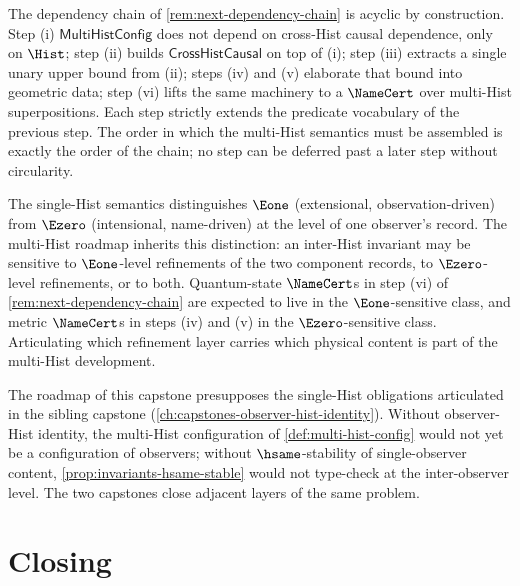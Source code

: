 \begin{remark}
\label{rem:chain-acyclic}
The dependency chain of \autoref{rem:next-dependency-chain} is acyclic by construction. Step (i) \(\mathsf{MultiHistConfig}\) does not depend on cross-Hist causal dependence, only on \(\Hist\); step (ii) builds \(\mathsf{CrossHistCausal}\) on top of (i); step (iii) extracts a single unary upper bound from (ii); steps (iv) and (v) elaborate that bound into geometric data; step (vi) lifts the same machinery to a \(\NameCert\) over multi-Hist superpositions. Each step strictly extends the predicate vocabulary of the previous step. The order in which the multi-Hist semantics must be assembled is exactly the order of the chain; no step can be deferred past a later step without circularity.
\end{remark}

\begin{remark}
\label{rem:e1-e0-multi-hist}
The single-Hist semantics distinguishes \(\Eone\) (extensional, observation-driven) from \(\Ezero\) (intensional, name-driven) at the level of one observer's record. The multi-Hist roadmap inherits this distinction: an inter-Hist invariant may be sensitive to \(\Eone\)-level refinements of the two component records, to \(\Ezero\)-level refinements, or to both. Quantum-state \(\NameCert\)s in step (vi) of \autoref{rem:next-dependency-chain} are expected to live in the \(\Eone\)-sensitive class, and metric \(\NameCert\)s in steps (iv) and (v) in the \(\Ezero\)-sensitive class. Articulating which refinement layer carries which physical content is part of the multi-Hist development.
\end{remark}

\begin{remark}
\label{rem:single-hist-preconditions}
The roadmap of this capstone presupposes the single-Hist obligations articulated in the sibling capstone (\autoref{ch:capstones-observer-hist-identity}). Without observer-Hist identity, the multi-Hist configuration of \autoref{def:multi-hist-config} would not yet be a configuration of observers; without \(\hsame\)-stability of single-observer content, \autoref{prop:invariants-hsame-stable} would not type-check at the inter-observer level. The two capstones close adjacent layers of the same problem.
\end{remark}

\section{Closing}
\label{sec:closing-inter-hist}

